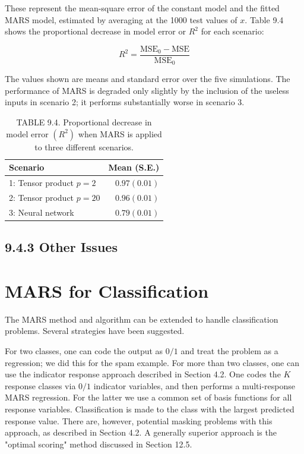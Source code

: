 \documentclass[10pt]{article}
\begin{document}
These represent the mean-square error of the constant model and the fitted MARS model, estimated by averaging at the 1000 test values of $x$. Table 9.4 shows the proportional decrease in model error or $R^{2}$ for each scenario:


\begin{equation*}
R^{2}=\frac{\mathrm{MSE}_{0}-\mathrm{MSE}}{\mathrm{MSE}_{0}} \tag{9.24}
\end{equation*}


The values shown are means and standard error over the five simulations. The performance of MARS is degraded only slightly by the inclusion of the useless inputs in scenario 2; it performs substantially worse in scenario 3.

\begin{table}[h]
\begin{center}
\captionsetup{labelformat=empty}
\caption{TABLE 9.4. Proportional decrease in model error $\left(R^{2}\right)$ when MARS is applied to three different scenarios.}
\begin{tabular}{lr}
\hline
Scenario & Mean (S.E.) \\
\hline
1: Tensor product $p=2$ & $0.97(0.01)$ \\
2: Tensor product $p=20$ & $0.96(0.01)$ \\
3: Neural network & $0.79(0.01)$ \\
\hline
\end{tabular}
\end{center}
\end{table}

\subsection*{9.4.3 Other Issues}
\section*{MARS for Classification}
The MARS method and algorithm can be extended to handle classification problems. Several strategies have been suggested.

For two classes, one can code the output as $0 / 1$ and treat the problem as a regression; we did this for the spam example. For more than two classes, one can use the indicator response approach described in Section 4.2. One codes the $K$ response classes via $0 / 1$ indicator variables, and then performs a multi-response MARS regression. For the latter we use a common set of basis functions for all response variables. Classification is made to the class with the largest predicted response value. There are, however, potential masking problems with this approach, as described in Section 4.2. A generally superior approach is the "optimal scoring" method discussed in Section 12.5.
\end{document}
